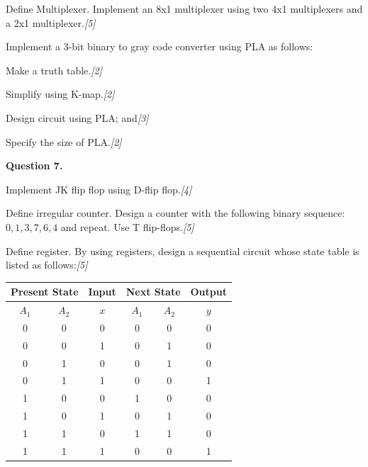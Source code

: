 \documentclass[11pt,a4paper]{article}
\newcommand{\pts}[1]{\hfill   \textit{[#1]}}
\begin{document}
\begin{parts}
  \item Define Multiplexer. Implement an 8x1 multiplexer using two 4x1 multiplexers and a 2x1 multiplexer.\pts{5}
  \item Implement a 3-bit binary to gray code converter using PLA as follows:
  
\begin{parts}
    \item Make a truth table.\pts{2}
    \item Simplify using K-map.\pts{2}
    \item Design circuit using PLA; and\pts{3}
    \item Specify the size of PLA.\pts{2}
  \end{parts}
\end{parts}

\bigskip




\noindent   \textbf{Question 7.}

\begin{parts}
  \item Implement JK flip flop using D-flip flop.\pts{4}
  \item Define irregular counter. Design a counter with the following binary sequence: $0, 1, 3, 7, 6, 4$ and repeat. Use T flip-flops.\pts{5}
  \item Define register. By using registers, design a sequential circuit whose state table is listed as follows:\pts{5}
  
  
\begin{center}
  
\begin{tabular}{|cc|c|cc|c|}
  \hline
  \multicolumn{2}{|c|}{   \textbf{Present State}} &   \textbf{Input} & \multicolumn{2}{c|}{   \textbf{Next State}} &   \textbf{Output} \\
  \hline
  $A_1$ & $A_2$ & $x$ & $A_1$ & $A_2$ & $y$ \\
  \hline
  0 & 0 & 0 & 0 & 0 & 0 \\
  0 & 0 & 1 & 0 & 1 & 0 \\
  0 & 1 & 0 & 0 & 1 & 0 \\
  0 & 1 & 1 & 0 & 0 & 1 \\
  1 & 0 & 0 & 1 & 0 & 0 \\
  1 & 0 & 1 & 0 & 1 & 0 \\
  1 & 1 & 0 & 1 & 1 & 0 \\
  1 & 1 & 1 & 0 & 0 & 1 \\
  \hline
  \end{tabular}
  \end{center}
\end{parts}
\end{document}
